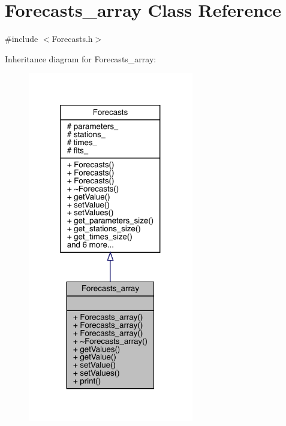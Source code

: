 \hypertarget{class_forecasts__array}{}\section{Forecasts\+\_\+array Class Reference}
\label{class_forecasts__array}


{\ttfamily \#include $<$Forecasts.\+h$>$}



Inheritance diagram for Forecasts\+\_\+array\+:
\nopagebreak
\begin{figure}[H]
\begin{center}
\leavevmode
\includegraphics[width=205pt]{class_forecasts__array__inherit__graph}
\end{center}
\end{figure}


